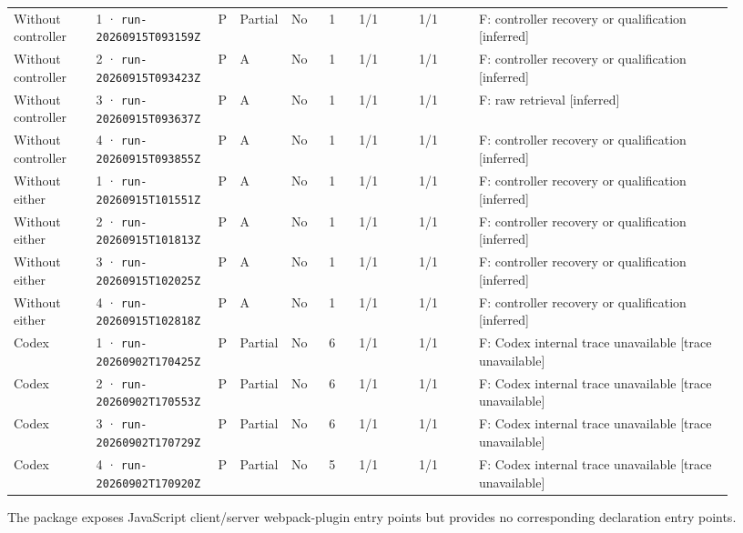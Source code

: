 \begin{landscape}
\begin{longtable}{@{}L{0.11\linewidth}L{0.16\linewidth}*{2}{L{0.022\linewidth}}L{0.05\linewidth}L{0.045\linewidth}L{0.08\linewidth}L{0.085\linewidth}L{0.346\linewidth}@{}}
Without controller & 1 · \texttt{run-20260915\allowbreak T093159Z} & P & Partial & No & 1 & 1/1 & 1/1 & F: controller recovery or qualification [inferred] \\
Without controller & 2 · \texttt{run-20260915\allowbreak T093423Z} & P & A & No & 1 & 1/1 & 1/1 & F: controller recovery or qualification [inferred] \\
Without controller & 3 · \texttt{run-20260915\allowbreak T093637Z} & P & A & No & 1 & 1/1 & 1/1 & F: raw retrieval [inferred] \\
Without controller & 4 · \texttt{run-20260915\allowbreak T093855Z} & P & A & No & 1 & 1/1 & 1/1 & F: controller recovery or qualification [inferred] \\
Without either & 1 · \texttt{run-20260915\allowbreak T101551Z} & P & A & No & 1 & 1/1 & 1/1 & F: controller recovery or qualification [inferred] \\
Without either & 2 · \texttt{run-20260915\allowbreak T101813Z} & P & A & No & 1 & 1/1 & 1/1 & F: controller recovery or qualification [inferred] \\
Without either & 3 · \texttt{run-20260915\allowbreak T102025Z} & P & A & No & 1 & 1/1 & 1/1 & F: controller recovery or qualification [inferred] \\
Without either & 4 · \texttt{run-20260915\allowbreak T102818Z} & P & A & No & 1 & 1/1 & 1/1 & F: controller recovery or qualification [inferred] \\
Codex & 1 · \texttt{run-20260902\allowbreak T170425Z} & P & Partial & No & 6 & 1/1 & 1/1 & F: Codex internal trace unavailable [trace unavailable] \\
Codex & 2 · \texttt{run-20260902\allowbreak T170553Z} & P & Partial & No & 6 & 1/1 & 1/1 & F: Codex internal trace unavailable [trace unavailable] \\
Codex & 3 · \texttt{run-20260902\allowbreak T170729Z} & P & Partial & No & 6 & 1/1 & 1/1 & F: Codex internal trace unavailable [trace unavailable] \\
Codex & 4 · \texttt{run-20260902\allowbreak T170920Z} & P & Partial & No & 5 & 1/1 & 1/1 & F: Codex internal trace unavailable [trace unavailable] \\
\end{longtable}
\endgroup
\end{landscape}

\label{sec:vuejs-vue-6301}

The package exposes JavaScript client/server webpack-plugin entry points but provides no corresponding declaration entry points.

